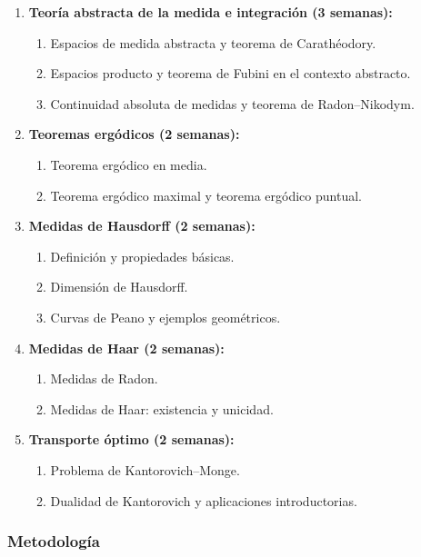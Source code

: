 \begin{refsection}
\begin{enumerate}
\item \textbf{Teoría abstracta de la medida e integración (3 semanas):}
\begin{enumerate}
    \item Espacios de medida abstracta y teorema de Carathéodory.
    \item Espacios producto y teorema de Fubini en el contexto abstracto.
    \item Continuidad absoluta de medidas y teorema de Radon--Nikodym.
\end{enumerate}

\item \textbf{Teoremas ergódicos (2 semanas):}
\begin{enumerate}
    \item Teorema ergódico en media.
    \item Teorema ergódico maximal y teorema ergódico puntual.
\end{enumerate}

\item \textbf{Medidas de Hausdorff (2 semanas):}
\begin{enumerate}
    \item Definición y propiedades básicas.
    \item Dimensión de Hausdorff.
    \item Curvas de Peano y ejemplos geométricos.
\end{enumerate}

\item \textbf{Medidas de Haar (2 semanas):}
\begin{enumerate}
    \item Medidas de Radon.
    \item Medidas de Haar: existencia y unicidad.
\end{enumerate}

\item \textbf{Transporte óptimo (2 semanas):}
\begin{enumerate}
    \item Problema de Kantorovich--Monge.
    \item Dualidad de Kantorovich y aplicaciones introductorias.
\end{enumerate}

\end{enumerate}

\subsubsection*{Metodología}


\end{refsection}
